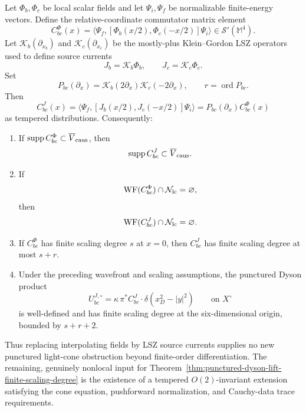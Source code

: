 \begin{proposition}
\label{prop:source-current-differentials-preserve-punctured-input}
Let \(\Phi_b,\Phi_c\) be local scalar fields and let
\(\Psi_i,\Psi_f\) be normalizable finite-energy vectors.  Define the
relative-coordinate commutator matrix element
\begin{equation}
  C^\Phi_{bc}(x)
  =
  \langle\Psi_f,[\Phi_b(x/2),\Phi_c(-x/2)]\Psi_i\rangle
  \in\mathcal S'(\mathbb M^4).
  \label{eq:field-commutator-relative-coordinate}
\end{equation}
Let \(\mathcal K_b(\partial_{x_b})\) and
\(\mathcal K_c(\partial_{x_c})\) be the mostly-plus Klein--Gordon LSZ
operators used to define source currents
\[
  J_b=\mathcal K_b\Phi_b,\qquad J_c=\mathcal K_c\Phi_c.
\]
Set
\begin{equation}
  P_{bc}(\partial_x)
  =
  \mathcal K_b(2\partial_x)\mathcal K_c(-2\partial_x),
  \qquad
  r=\operatorname{ord}P_{bc}.
  \label{eq:source-current-relative-differential-operator}
\end{equation}
Then
\begin{equation}
  C^J_{bc}(x)
  =
  \langle\Psi_f,[J_b(x/2),J_c(-x/2)]\Psi_i\rangle
  =
  P_{bc}(\partial_x)C^\Phi_{bc}(x)
  \label{eq:source-current-commutator-differential-reduction}
\end{equation}
as tempered distributions.  Consequently:
\begin{enumerate}
  \item If \(\operatorname{supp}C^\Phi_{bc}\subset\overline V_{\rm caus}\),
  then
  \[
    \operatorname{supp}C^J_{bc}\subset\overline V_{\rm caus}.
  \]
  \item If
  \[
    \operatorname{WF}(C^\Phi_{bc})\cap\mathcal N_{\rm lc}=\varnothing ,
  \]
  then
  \[
    \operatorname{WF}(C^J_{bc})\cap\mathcal N_{\rm lc}=\varnothing .
  \]
  \item If \(C^\Phi_{bc}\) has finite scaling degree \(s\) at \(x=0\), then
  \(C^J_{bc}\) has finite scaling degree at most \(s+r\).
  \item Under the preceding wavefront and scaling assumptions, the punctured
  Dyson product
  \begin{equation}
    U^{J,\circ}_{bc}
    =
    \kappa\,\pi^*C^J_{bc}\cdot\delta(x_D^2-|y|^2)
    \qquad\text{on }X^\circ
    \label{eq:source-current-punctured-dyson-product}
  \end{equation}
  is well-defined and has finite scaling degree at the six-dimensional
  origin, bounded by \(s+r+2\).
\end{enumerate}
Thus replacing interpolating fields by LSZ source currents supplies no new
punctured light-cone obstruction beyond finite-order differentiation.  The
remaining, genuinely nonlocal input for
Theorem~\ref{thm:punctured-dyson-lift-finite-scaling-degree} is the existence
of a tempered \(O(2)\)-invariant extension satisfying the cone equation,
pushforward normalization, and Cauchy-data trace requirements.
\end{proposition}

